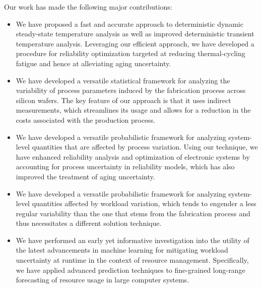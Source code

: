 Our work has made the following major contributions:

\begin{itemize}

\item
We have proposed a fast and accurate approach to deterministic dynamic
steady-state temperature analysis as well as improved deterministic transient
temperature analysis. Leveraging our efficient approach, we have developed a
procedure for reliability optimization targeted at reducing thermal-cycling
fatigue and hence at alleviating aging uncertainty.

\item
We have developed a versatile statistical framework for analyzing the
variability of process parameters induced by the fabrication process across
silicon wafers. The key feature of our approach is that it uses indirect
measurements, which streamlines its usage and allows for a reduction in the
costs associated with the production process.

\item
We have developed a versatile probabilistic framework for analyzing system-level
quantities that are affected by process variation. Using our technique, we have
enhanced reliability analysis and optimization of electronic systems by
accounting for process uncertainty in reliability models, which has also
improved the treatment of aging uncertainty.

\item
We have developed a versatile probabilistic framework for analyzing system-level
quantities affected by workload variation, which tends to engender a less
regular variability than the one that stems from the fabrication process and
thus necessitates a different solution technique.

\item
We have performed an early yet informative investigation into the utility of the
latest advancements in machine learning for mitigating workload uncertainty at
runtime in the context of resource management. Specifically, we have applied
advanced prediction techniques to fine-grained long-range forecasting of
resource usage in large computer systems.

\end{itemize}
